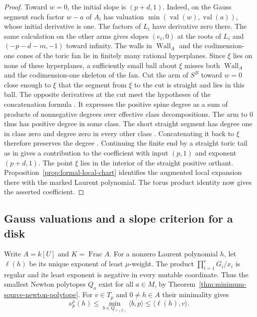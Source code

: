 \documentclass[11pt,reqno]{amsart}
\numberwithin{equation}{section}
\theoremstyle{definition}
\theoremstyle{remark}
\DeclareMathOperator{\Frac}{Frac}
\begin{document}
\begin{proof}
Toward \(w=0\), the initial slope is \((p+d,1)\). Indeed, on the
Gauss segment each factor \(w-a\) of \(A_i\) has valuation
\(\min(\operatorname{val}(w),\operatorname{val}(a))\), whose initial
derivative is one. The factors of \(L_i\) have derivative zero there.
The same calculation on the other arms gives slopes \((e_i,0)\)
at the roots of \(L_i\) and \((-p-d-m,-1)\) toward infinity.
The walls in \(\operatorname{Wall}_A\) and the codimension-one cones of
the toric fan lie in finitely many rational hyperplanes. Since \(\xi\)
lies on none of these hyperplanes, a sufficiently small ball about \(\xi\)
misses both \(\operatorname{Wall}_A\) and the codimension-one skeleton
of the fan. Cut the arm of \(S^B\)
toward \(w=0\) close enough to \(\xi\) that the segment from \(\xi\)
to the cut is straight and lies in this ball. The opposite
derivatives at the cut meet the hypotheses of the concatenation
formula \cite[Theorem~12.4]{KY}. It expresses the positive spine
degree as a sum of products of nonnegative degrees over effective
class decompositions. The arm to \(0\) thus has positive degree
in some class. The short straight segment has degree one in class
zero and degree zero in every other class \cite[Lemma~12.3]{KY}.
Concatenating it back to \(\xi\) therefore preserves the degree
\cite[Theorem~12.4]{KY}.
Continuing the finite end by a straight toric tail as in
\cite[Construction~9.3, Lemma~9.12 and Definition~20.20]{KY}
gives a contribution to the
coefficient with input \((p,1)\) and exponent \((p+d,1)\).
The point \(\xi\) lies in the interior of the straight positive
orthant. Proposition~\ref{prop:formal-local-chart} identifies the
augmented local expansion there with the marked Laurent polynomial.
The torus product identity now gives the asserted coefficient.
\end{proof}

\subsection{Gauss valuations and a slope criterion for a disk}

Write \(A=k[U]\) and \(K=\Frac A\). For a nonzero
Laurent polynomial \(h\), let \(\ell(h)\) be its unique exponent of
least \(\mu\)-weight. The product \(\prod_{i=1}^r G_i/x_i\) is regular
and its least exponent is negative in every mutable coordinate.
Thus the smallest Newton polytopes \(Q_a\) exist for all \(a\in M\), by
Theorem~\ref{thm:minimum-source-newton-polytope}. For \(v\in T_p\)
and \(0\ne h\in A\) their minimality gives
\begin{equation}\label{eq:corner-order-bound}
 \nu^x_p(h)\le\min_{b\in Q_{\ell(h)}}\langle b,p\rangle
                    \le\langle\ell(h),v\rangle .
\end{equation}
\end{document}
